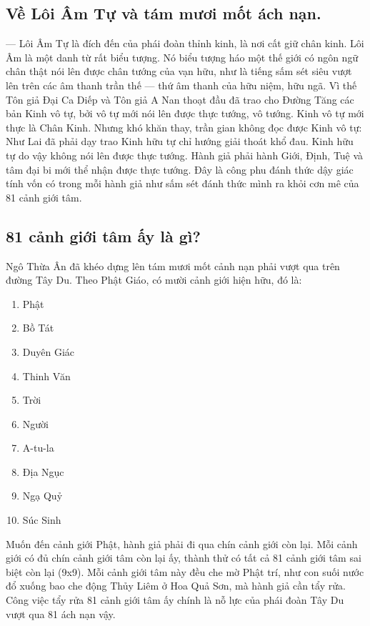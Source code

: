 \subsection{Về Lôi Âm Tự và tám mươi mốt ách nạn.} %
\label{sub:ve_loi_am_tu_va_tam_muoi_mot_ach_nan}

— Lôi Âm Tự là đích đến của phái đoàn thỉnh kinh, là nơi cất giữ chân kinh. Lôi Âm là một danh từ rất biểu tượng. Nó biểu tượng háo một thế giới có ngôn ngữ chân thật nói lên được chân tướng của vạn hữu, như là tiếng sấm sét siêu vượt lên trên các âm thanh trần thế — thứ âm thanh của hữu niệm, hữu ngã. Vì thế Tôn giả Đại Ca Diếp và Tôn giả A Nan thoạt đầu đã trao cho Đường Tăng các bản Kinh vô tự, bởi vô tự mới nói lên được thực tướng, vô tướng. Kinh vô tự mới thực là Chân Kinh. Nhưng khó khăn thay, trần gian không đọc được Kinh vô tự: Như Lai đã phải dạy trao Kinh hữu tự chỉ hướng giải thoát khổ đau. Kinh hữu tự do vậy không nói lên được thực tướng. Hành giả phải hành Giới, Định, Tuệ và tâm đại bi mới thể nhận được thực tướng. Đây là công phu đánh thức dậy giác tính vốn có trong mỗi hành giả như sấm sét đánh thức mình ra khỏi cơn mê của 81 cảnh giới tâm.

\subsection{81 cảnh giới tâm ấy là gì?} %
\label{sub:81_canh_gioi_tam}

Ngô Thừa Ân đã khéo dựng lên tám mươi mốt cảnh nạn phải vượt qua trên đường Tây Du. Theo Phật Giáo, có mười cảnh giới hiện hữu, đó là:

\begin{multicols}{2}
\begin{enumerate}[label=\itshape\arabic*\upshape/]
    \item Phật
    \item Bồ Tát
    \item Duyên Giác
    \item Thinh Văn
    \item Trời
    \item Người
    \item A-tu-la
    \item Địa Ngục
    \item Ngạ Quỷ
    \item Súc Sinh
\end{enumerate}
\end{multicols}

Muốn đến cảnh giới Phật, hành giả phải đi qua chín cảnh giới còn lại. Mỗi cảnh giới có đủ chín cảnh giới tâm còn lại ấy, thành thử có tất cả 81 cảnh giới tâm sai biệt còn lại (9x9). Mỗi cảnh giới tâm này đều che mờ Phật trí, như con suối nước đổ xuống bao che động Thủy Liêm ở Hoa Quả Sơn, mà hành giả cần tẩy rửa. Công việc tẩy rửa 81 cảnh giới tâm ấy chính là nỗ lực của phái đoàn Tây Du vượt qua 81 ách nạn vậy.
